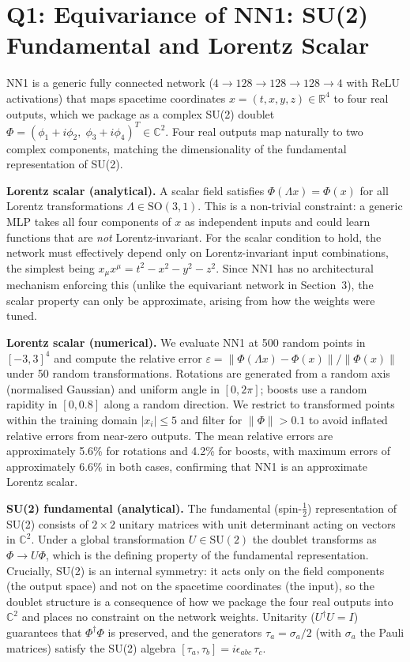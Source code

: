 \documentclass[10pt,leqno]{amsart}
\begin{document}
\section{Q1: Equivariance of NN1: SU(2) Fundamental and Lorentz Scalar}

NN1 is a generic fully connected network ($4 \to 128 \to 128 \to 128 \to 4$
with ReLU activations) that maps spacetime coordinates
$x = (t,x,y,z) \in \mathbb{R}^4$ to four real outputs, which we package
as a complex SU(2) doublet
$\Phi = (\phi_1 + i\phi_2,\; \phi_3 + i\phi_4)^T \in \mathbb{C}^2$.
Four real outputs map naturally to two complex components, matching the
dimensionality of the fundamental representation of SU(2).

\textbf{Lorentz scalar (analytical).}
A scalar field satisfies $\Phi(\Lambda x) = \Phi(x)$ for all Lorentz
transformations $\Lambda \in \mathrm{SO}(3,1)$. This is a non-trivial
constraint: a generic MLP takes all four components of $x$ as independent
inputs and could learn functions that are \emph{not} Lorentz-invariant.
For the scalar condition to hold, the network must effectively depend only
on Lorentz-invariant input combinations, the simplest being
$x_\mu x^\mu = t^2 - x^2 - y^2 - z^2$. Since NN1 has no architectural
mechanism enforcing this (unlike the equivariant network in Section~3),
the scalar property can only be approximate, arising from how the weights
were tuned.

\textbf{Lorentz scalar (numerical).}
We evaluate NN1 at 500 random points in $[-3, 3]^4$ and compute the
relative error
$\varepsilon = \|\Phi(\Lambda x) - \Phi(x)\| / \|\Phi(x)\|$ under 50
random transformations. Rotations are generated from a random axis
(normalised Gaussian) and uniform angle in $[0, 2\pi]$; boosts use a
random rapidity in $[0, 0.8]$ along a random direction. We restrict to
transformed points within the training domain $|x_i| \leq 5$ and filter
for $\|\Phi\| > 0.1$ to avoid inflated relative errors from near-zero
outputs. The mean relative errors are approximately 5.6\% for rotations
and 4.2\% for boosts, with maximum errors of approximately 6.6\% in both
cases, confirming that NN1 is an approximate Lorentz scalar.

\textbf{SU(2) fundamental (analytical).}
The fundamental (spin-$\tfrac{1}{2}$) representation of SU(2) consists of
$2 \times 2$ unitary matrices with unit determinant acting on vectors in
$\mathbb{C}^2$. Under a global transformation $U \in \mathrm{SU}(2)$ the
doublet transforms as $\Phi \to U\Phi$, which is the defining
property of the fundamental representation. Crucially, SU(2) is an internal
symmetry: it acts only on the field components (the output space) and not
on the spacetime coordinates (the input), so the doublet structure is a
consequence of how we package the four real outputs into $\mathbb{C}^2$
and places no constraint on the network weights. Unitarity
($U^\dagger U = I$) guarantees that $\Phi^\dagger\Phi$ is preserved, and
the generators $\tau_a = \sigma_a / 2$ (with $\sigma_a$ the Pauli
matrices) satisfy the SU(2) algebra
$[\tau_a, \tau_b] = i\epsilon_{abc}\,\tau_c$.
\end{document}
